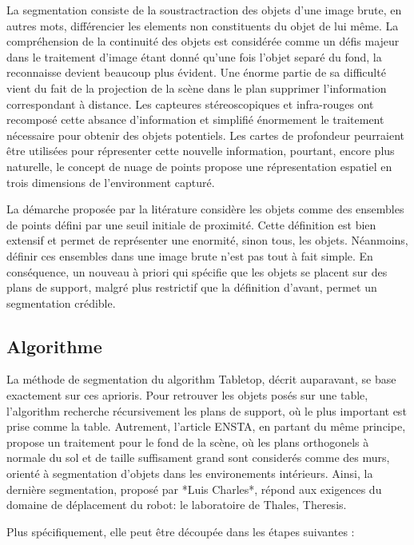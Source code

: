 La segmentation consiste de la soustractraction des objets d'une image
brute, en autres mots, différencier les elements non constituents du
objet de lui même. La compréhension de la continuité des objets est
considérée comme un défis majeur dans le traitement d'image étant
donné qu'une fois l'objet separé du fond, la reconnaisse devient
beaucoup plus évident. Une énorme partie de sa difficulté vient du fait
de la projection de la scène dans le plan supprimer l'information
correspondant à distance. Les capteures stéreoscopiques et
infra-rouges ont recomposé cette absance d'information et simplifié
énormement le traitement nécessaire pour obtenir des objets
potentiels. Les cartes de profondeur peurraient être utilisées pour
répresenter cette nouvelle information, pourtant, encore plus
naturelle, le concept de nuage de points propose une répresentation
espatiel en trois dimensions de l'environment capturé.

La démarche proposée par la litérature considère les objets comme des
ensembles de points défini par une seuil initiale de proximité. Cette
définition est bien extensif et permet de représenter une enormité,
sinon tous, les objets. Néanmoins, définir ces ensembles dans une
image brute n'est pas tout à fait simple. En conséquence, un nouveau à
priori qui spécifie que les objets se placent sur des plans de
support, malgré plus restrictif que la définition d'avant, permet un
segmentation crédible.

\subsection{Algorithme}

La méthode de segmentation du algorithm Tabletop, décrit auparavant,
se base exactement sur ces aprioris. Pour retrouver les objets posés
sur une table, l'algorithm recherche récursivement les plans de
support, où le plus important est prise comme la table. Autrement,
l'article {\color{blue}ENSTA}, en partant du même principe, propose un
traitement pour le fond de la scène, où les plans orthogonels à
normale du sol et de taille suffisament grand sont considerés comme
des murs, orienté à segmentation d'objets dans les environements
intérieurs. Ainsi, la dernière segmentation, proposé par *Luis
Charles*, répond aux exigences du domaine de déplacement du robot: le
laboratoire de Thales, Theresis.

Plus spécifiquement, elle peut être découpée dans les étapes suivantes
:

